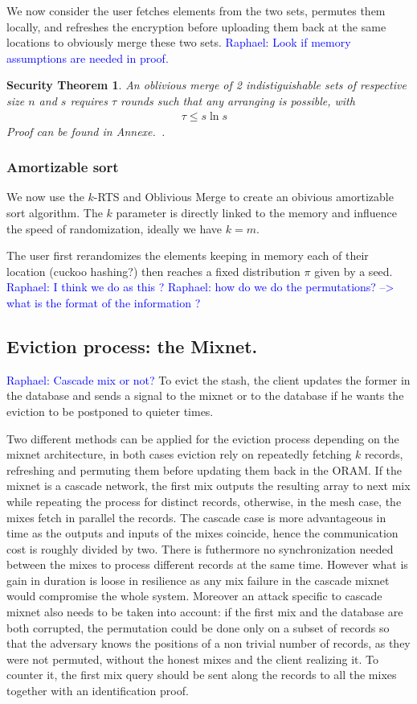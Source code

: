 \documentclass[conference]{IEEEtran}
\newtheorem{secthm}{Security Theorem}
\newcommand{\raphael}[1]{\textcolor{blue}{Raphael: #1}}
\begin{document}
We now consider the user fetches elements from the two sets, permutes them locally, and refreshes the encryption before uploading them back at the same locations to obviously merge these two sets.
\raphael{Look if memory assumptions are needed in proof.}

\begin{secthm}
An oblivious merge of 2 indistiguishable sets of respective size $n$ and $s$ requires $\tau$ rounds such that any arranging is possible, with
\begin{align*}
\tau \leq s \ln{s}&
\end{align*}
Proof can be found in Annexe.~\cite{}.
\end{secthm}

\subsubsection{Amortizable sort}

We now use the $k$-RTS and Oblivious Merge to create an obivious amortizable sort algorithm. The $k$ parameter is directly linked to the memory and influence the speed of randomization, ideally we have $k=m$.

The user first rerandomizes the elements keeping in memory each of their location (cuckoo hashing?) then reaches a fixed distribution $\pi$ given by a seed.
\raphael{I think we do as this ?}
\raphael{how do we do the permutations? --> what is the format of the information ?}

\subsection{Eviction process: the Mixnet.}
\raphael{Cascade mix or not?}
To evict the stash, the client updates the former in the database and sends a signal to the mixnet or to the database if he wants the eviction to be postponed to quieter times.

Two different methods can be applied for the eviction process depending on the mixnet architecture, in both cases eviction rely on repeatedly fetching $k$ records, refreshing and permuting them before updating them back in the ORAM.
If the mixnet is a cascade network, the first mix outputs the resulting array to next mix while repeating the process for distinct records, otherwise, in the mesh case, the mixes fetch in parallel the records.
The cascade case is more advantageous in time as the outputs and inputs of the mixes coincide, hence the communication cost is roughly divided by two. There is futhermore no synchronization needed between the mixes to process different records at the same time.
However what is gain in duration is loose in resilience as any mix failure in the cascade mixnet would compromise the whole system. Moreover an attack specific to cascade mixnet also needs to be taken into account: if the first mix and the database are both corrupted, the permutation could be done only on a subset of records
so that the adversary knows the positions of a non trivial number of records, as they were not permuted, without the honest mixes and the client realizing it. To counter it, the first mix query should be sent along the records to all the mixes together with an identification proof.
\end{document}
